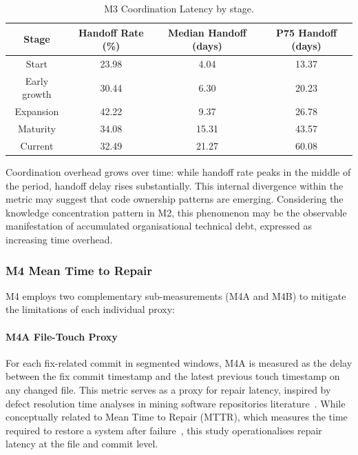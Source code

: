 \documentclass[11pt, a4paper]{article}
\begin{document}
\begin{table}[H]
\centering
\small
\begin{tabularx}{\textwidth}{|C|C|C|C|}
    \hline
    \textbf{Stage} & \textbf{Handoff Rate (\%)} & \textbf{Median Handoff (days)} & \textbf{P75 Handoff (days)} \\
    \hline
    Start & 23.98 & 4.04 & 13.37 \\
    \hline
    Early growth & 30.44 & 6.30 & 20.23 \\
    \hline
    Expansion & 42.22 & 9.37 & 26.78 \\
    \hline
    Maturity & 34.08 & 15.31 & 43.57 \\
    \hline
    Current & 32.49 & 21.27 & 60.08 \\
    \hline
\end{tabularx}
\caption{M3 Coordination Latency by stage.}
\label{tab:m3_coordination_latency}
\end{table}

Coordination overhead grows over time: while handoff rate peaks in the middle of the period, handoff delay rises substantially. This internal divergence within the metric may suggest that code ownership patterns are emerging. Considering the knowledge concentration pattern in M2, this phenomenon may be the observable manifestation of accumulated organisational technical debt, expressed as increasing time overhead.

\subsubsection{M4 Mean Time to Repair}

M4 employs two complementary sub-measurements (M4A and M4B) to mitigate the limitations of each individual proxy:

\paragraph{M4A File-Touch Proxy}
For each fix-related commit in segmented windows, M4A is measured as the delay between the fix commit timestamp and the latest previous touch timestamp on any changed file. This metric serves as a proxy for repair latency, inspired by defect resolution time analyses in mining software repositories literature~\cite{kim_defect_resolution_time_2006}. While conceptually related to Mean Time to Repair (MTTR), which measures the time required to restore a system after failure~\cite{perry_testing_reliability}, this study operationalises repair latency at the file and commit level.
\end{document}
